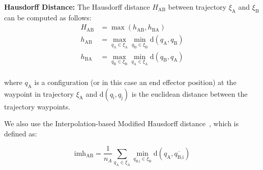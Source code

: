 \documentclass[letterpaper, 10 pt, conference]{ieeeconf}  %
\newcommand{\tj}[1]{\ensuremath{\xi_\text{#1}}}
\begin{document}




{\bf Hausdorff Distance:}
The Hausdorff distance $H_\text{AB}$ between trajectory $\xi_\text{A}$ and $\xi_\text{B}$ can be computed as follows:
\begin{equation}
\begin{aligned}
H_\text{AB} &= \max (h_{\text{AB}}, h_{\text{BA}}) \\
h_{\text{AB}} &= \max_{q_\text{A} \in \xi_\text{A}} \min_{q_\text{B} \in \xi_\text{B}} \text{d}(q_\text{A}, q_\text{B})\\
h_{\text{BA}} &= \max_{q_\text{B} \in \xi_\text{B}} \min_{q_\text{A} \in \xi_\text{A}} \text{d}(q_\text{B}, q_\text{A})\\
\end{aligned}
\end{equation}

where $q_\text{A}$ is a configuration (or in this case an end effector position) at the waypoint in trajectory \tj{A} and $\text{d}(q_\text{i}, q_\text{j})$ is the euclidean distance between the trajectory waypoints.

We also use the Interpolation-based Modified Hausdorff distance~\cite{dubuisson1994modified}, which is defined as:

\begin{equation}
\text{imh}_\text{AB} = \frac{1}{n_A} \sum_{q_\text{A} \in \xi_\text{A}} \min_{\overline{q_\text{B,i}} \in \xi_\text{B}} \text{d}(q_\text{A}, \overline{q_\text{B,i}})
\end{equation}
\end{document}
